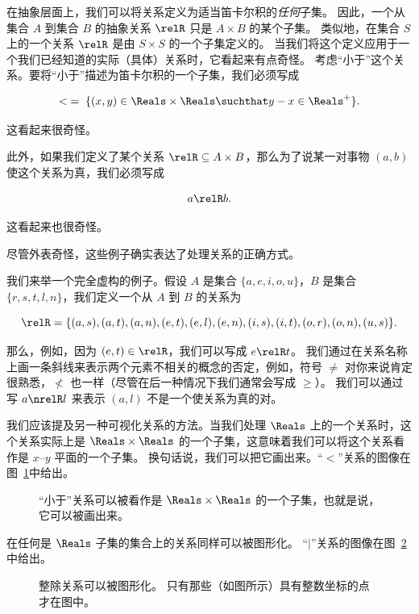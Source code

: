 在抽象层面上，我们可以将关系定义为适当笛卡尔积的\emph{任何}子集。
因此，一个从集合 $A$ 到集合 $B$ 的抽象关系 $\relR$ 只是 $A \times B$ 的某个子集。
类似地，在集合 $S$ 上的一个关系 $\relR$ 是由 $S \times S$ 的一个子集定义的。
当我们将这个定义应用于一个我们已经知道的实际（具体）关系时，它看起来有点奇怪。
考虑“小于”这个关系。要将“小于”描述为笛卡尔积的一个子集，我们必须写成

\[ < \;
= \; \{ (x,y) \in \Reals \times \Reals \suchthat y-x \in \Reals^+ \}.\] 

\noindent 这看起来很奇怪。

此外，如果我们定义了某个关系 $\relR \subseteq A \times B$，那么为了说某一对事物 $(a,b)$ 使这个关系为真，我们必须写成

\[ a\relR b.
\]

\noindent 这看起来也很奇怪。

尽管外表奇怪，这些例子确实表达了处理关系的正确方式。

我们来举一个完全虚构的例子。假设 $A$ 是集合 $\{a,e,i,o,u\}$，$B$ 是集合 $\{r,s,t,l,n\}$，我们定义一个从 $A$ 到 $B$ 的关系为

\[ \relR = \{ (a,s), (a,t), (a,n), (e,t), (e,l), (e,n), (i,s), (i,t), (o,r), (o,n), (u,s) \}.
\]

那么，例如，因为 $(e,t) \in \relR$，我们可以写成 $e \relR t$。
我们通过在关系名称上画一条斜线来表示两个元素不相关的概念的否定，例如，符号 $\neq$ 对你来说肯定很熟悉，$\nless$ 也一样（尽管在后一种情况下我们通常会写成 $\geq$）。
我们可以通过写 $a \nrelR l$ 来表示 $(a,l)$ 不是一个使关系为真的对。

我们应该提及另一种可视化关系的方法。当我们处理 $\Reals$ 上的一个关系时，这个关系实际上是 $\Reals \times \Reals$ 的一个子集，这意味着我们可以将这个关系看作是 $x$--$y$ 平面的一个子集。
换句话说，我们可以把它画出来。“$<$”关系的图像在图~\ref{fig:lt_graph}中给出。

\begin{figure}[!hbtp]
\begin{center}

\end{center}
\caption[“小于”关系的图像。]{“小于”关系可以被看作是 $\Reals \times \Reals$ 的一个子集，也就是说，它可以被画出来。}
\label{fig:lt_graph} 
\end{figure}
  
在任何是 $\Reals$ 子集的集合上的关系同样可以被图形化。
“$\mid$”关系的图像在图~\ref{fig:div_graph}中给出。

\begin{figure}[!hbtp]
\begin{center}

\end{center}
\caption[整除关系的图像。]{整除关系可以被图形化。
只有那些（如图所示）具有整数坐标的点才在图中。}
\label{fig:div_graph} 
\end{figure}
 

